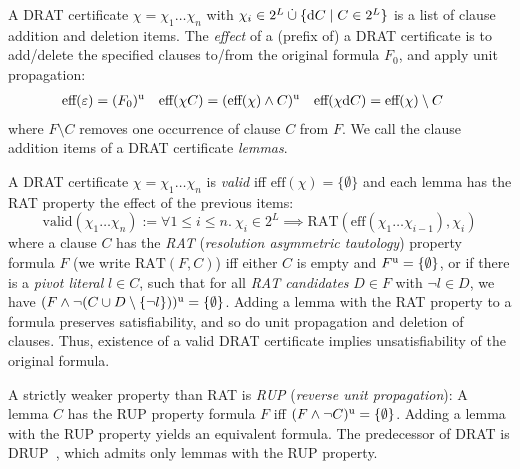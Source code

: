 \documentclass{llncs}
\begin{document}
A DRAT certificate $\chi = \chi_1\ldots\chi_n$ with $\chi_i \in 2^L \mathbin{\dot\cup} \{ \textrm d C \mid C\in 2^L \}$
is a list of clause addition and deletion items.
The \emph{effect} of a (prefix of) a DRAT certificate is to add/delete the specified clauses to/from the original formula $F_0$, and apply unit propagation:
\begin{align*}
  \textrm{eff}(\varepsilon) &= (F_0)^\textrm{u}&
  \textrm{eff}(\chi C) &= (\textrm{eff}(\chi) \wedge C)^\textrm{u}&
  \textrm{eff}(\chi\textrm d C) &= \textrm{eff}(\chi) \setminus C
\end{align*}
where $F \setminus C$ removes one occurrence of clause $C$ from $F$. %
We call the clause addition items of a DRAT certificate \emph{lemmas}.

A DRAT certificate $\chi = \chi_1\ldots\chi_n$ is \emph{valid} iff $\textrm{eff}(\chi) = \{\emptyset\}$ and each lemma has the RAT property \wrt the effect of the previous items:
\[
  \textrm{valid}(\chi_1 \ldots \chi_n) := \forall 1\le i\le n.~\chi_i\in2^L \implies\textrm{RAT}( \textrm{eff}(\chi_1\ldots \chi_{i-1}), \chi_i )
\]
where a clause $C$ has the \emph{RAT} (\emph{resolution asymmetric tautology}) property \wrt formula $F$ (we write $\textrm{RAT}(F,C)$) iff either $C$ is empty and $F^{\textrm u}=\{\emptyset\}$,
or if there is a \emph{pivot literal} $l\in C$, such that for all \emph{RAT candidates} $D\in F$ with $\neg l \in D$, we have $(F \wedge \neg(C \cup D\setminus\{\neg l\}))^{\textrm u} = \{\emptyset\}$.
Adding a lemma with the RAT property to a formula preserves satisfiability, and so do unit propagation and deletion of clauses. Thus, existence of a valid DRAT certificate implies unsatisfiability of the original formula.


A strictly weaker property than RAT is \emph{RUP} (\emph{reverse unit propagation}): A lemma $C$ has the RUP property \wrt formula $F$ iff $(F \wedge \neg C)^{\textrm u} = \{\emptyset\}$.
Adding a lemma with the RUP property yields an equivalent formula. The predecessor of DRAT is DRUP~\cite{HHW13}, which admits only lemmas with the RUP property.
\end{document}
